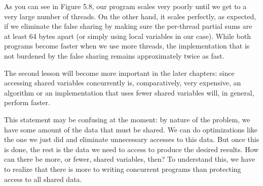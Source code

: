 As you can see in Figure 5.8, our program scales very poorly until we get to a very large number of threads. On the other hand, it scales perfectly, as expected, if we eliminate the false sharing by making sure the per-thread partial sums are at least 64 bytes apart (or simply using local variables in our case). While both programs become faster when we use more threads, the implementation that is not burdened by the false sharing remains approximately twice as fast.

The second lesson will become more important in the later chapters: since accessing shared variables concurrently is, comparatively, very expensive, an algorithm or an implementation that uses fewer shared variables will, in general, perform faster.

This statement may be confusing at the moment: by nature of the problem, we have some amount of the data that must be shared. We can do optimizations like the one we just did and eliminate unnecessary accesses to this data. But once this is done, the rest is the data we need to access to produce the desired results. How can there be more, or fewer, shared variables, then? To understand this, we have to realize that there is more to writing concurrent programs than protecting access to all shared data.







































